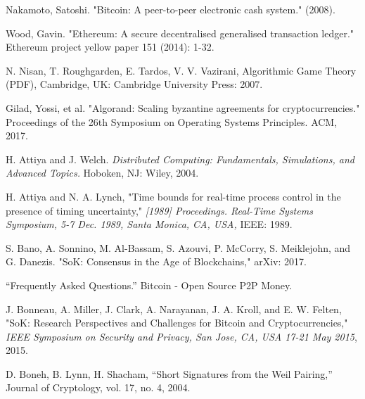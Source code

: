 \documentclass[10pt,journal,compsoc]{IEEEtran}
\begin{document}
%
%
%
\begin{thebibliography}{1}

 Nakamoto, Satoshi. "Bitcoin: A peer-to-peer electronic cash system." (2008).
 
 Wood, Gavin. "Ethereum: A secure decentralised generalised transaction ledger." Ethereum project yellow paper 151 (2014): 1-32.
 
 N. Nisan, T. Roughgarden, E. Tardos, V. V. Vazirani, Algorithmic Game Theory (PDF), Cambridge, UK: Cambridge University Press: 2007.

Gilad, Yossi, et al. "Algorand: Scaling byzantine agreements for cryptocurrencies." Proceedings of the 26th Symposium on Operating Systems Principles. ACM, 2017.

 H. Attiya and J. Welch. \emph{Distributed Computing: Fundamentals, Simulations, and Advanced Topics.} Hoboken, NJ: Wiley, 2004.

 H. Attiya and N. A. Lynch, "Time bounds for real-time process control in the presence of timing uncertainty," \emph{[1989] Proceedings. Real-Time Systems Symposium, 5-7 Dec. 1989, Santa Monica, CA, USA,} IEEE: 1989.

 S. Bano, A. Sonnino, M. Al-Bassam, S. Azouvi, P. McCorry, S. Meiklejohn, and G. Danezis. "SoK: Consensus in the Age of Blockchains," arXiv: 2017.

 “Frequently Asked Questions.” Bitcoin - Open Source P2P Money.

 J. Bonneau, A. Miller, J. Clark, A. Narayanan, J. A. Kroll, and E. W. Felten, "SoK: Research Perspectives and Challenges for Bitcoin and Cryptocurrencies," \emph{IEEE Symposium on Security and Privacy, San Jose, CA, USA 17-21 May 2015}, 2015.

 D. Boneh, B. Lynn, H. Shacham, “Short Signatures from the Weil Pairing,” Journal of Cryptology, vol. 17, no. 4, 2004.


\end{thebibliography}
\end{document}
